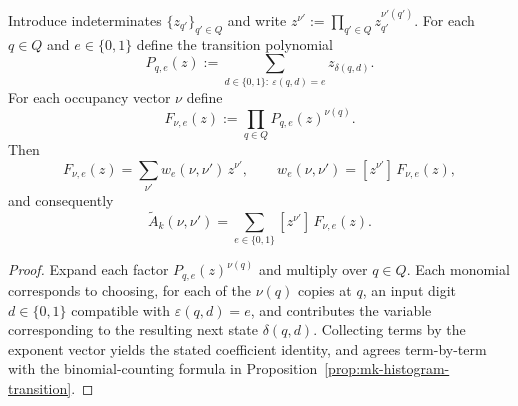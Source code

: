 \begin{corollary}\label{cor:mk-coefficient-extraction}
Introduce indeterminates $\{z_{q'}\}_{q'\in Q}$ and write $z^{\nu'}:=\prod_{q'\in Q} z_{q'}^{\nu'(q')}$.
For each $q\in Q$ and $e\in\{0,1\}$ define the transition polynomial
\[
P_{q,e}(z):=\sum_{d\in\{0,1\}:\ \varepsilon(q,d)=e} z_{\delta(q,d)}.
\]
For each occupancy vector $\nu$ define
\[
F_{\nu,e}(z):=\prod_{q\in Q} P_{q,e}(z)^{\nu(q)}.
\]
Then
\[
F_{\nu,e}(z)=\sum_{\nu'} w_e(\nu,\nu')\,z^{\nu'},
\qquad
w_e(\nu,\nu')=[z^{\nu'}]\,F_{\nu,e}(z),
\]
and consequently
\[
\widetilde A_k(\nu,\nu')
=
\sum_{e\in\{0,1\}}[z^{\nu'}]\,F_{\nu,e}(z).
\]
\end{corollary}

\begin{proof}
Expand each factor $P_{q,e}(z)^{\nu(q)}$ and multiply over $q\in Q$.
Each monomial corresponds to choosing, for each of the $\nu(q)$ copies at $q$, an input digit $d\in\{0,1\}$ compatible with $\varepsilon(q,d)=e$, and contributes the variable corresponding to the resulting next state $\delta(q,d)$.
Collecting terms by the exponent vector yields the stated coefficient identity, and agrees term-by-term with the binomial-counting formula in Proposition~\ref{prop:mk-histogram-transition}.
\end{proof}

